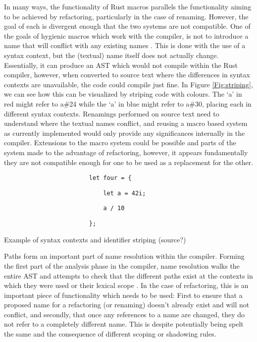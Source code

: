 In many ways, the functionality of Rust macros parallels the functionality aiming to be achieved by refactoring, particularly in the case of renaming. However, the goal of each is divergent enough that the two systems are not compatible. One of the goals of hygienic macros which work with the compiler, is not to introduce a name that will conflict with any existing names \cite{keep15}. This is done with the use of a syntax context, but the (textual) name itself does not actually change. Essentially, it can produce an AST which would not compile within the Rust compiler, however, when converted to source text where the differences in syntax contexts are unavailable, the code could compile just fine. In Figure \ref{Fig:striping}, we can see how this can be visualized by striping code with colours. The `a' in red might refer to a\#24 while the `a' in blue might refer to a\#30, placing each in different syntax contexts. Renamings performed on source text need to understand where the textual names conflict, and reusing a macro based system as currently implemented would only provide any significances internally in the compiler. Extensions to the macro system could be possible and parts of the system made to the advantage of refactoring, however, it appears fundamentally they are not compatible enough for one to be used as a replacement for the other.

\begin{fig}
{\color{blue}
\verb|                        let four = {|
}

{\color{red}

\verb|                            let a = 42i;|
}

{
\color{blue}

\verb|                            a / 10|
}

{\color{red}

\verb|                        };|
}

\caption{Example of syntax contexts and identifier striping (source?)}
\label{Fig:striping}
\end{fig}

Paths form an important part of name resolution within the compiler. Forming the first part of the analysis phase in the compiler, name resolution walks the entire AST and attempts to check that the different paths exist at the contexts in which they were used or their lexical scope \cite{driver15}. In the case of refactoring, this is an important piece of functionality which needs to be used: First to ensure that a proposed name for a refactoring (or renaming) doesn't already exist and will not conflict, and secondly, that once any references to a name are changed, they do not refer to a completely different name. This is despite potentially being spelt the same and the consequence of different scoping or shadowing rules.

